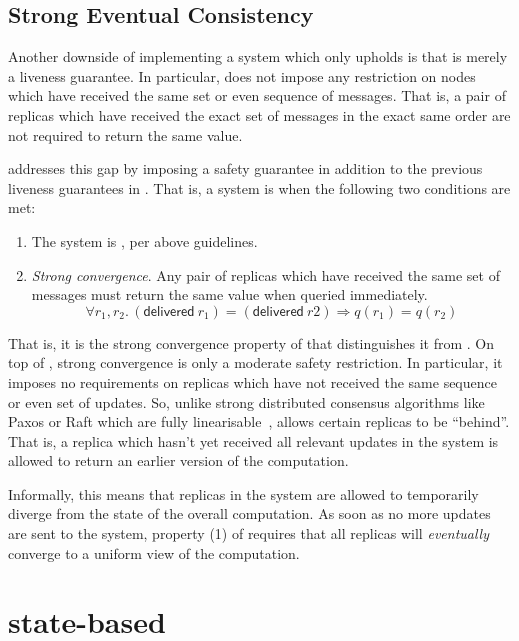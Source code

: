 \subsection{Strong Eventual Consistency}
Another downside of implementing a system which only upholds \EC is that \EC is
merely a liveness guarantee. In particular, \EC does not impose any restriction
on nodes which have received the same set or even sequence of messages. That is,
a pair of replicas which have received the exact set of messages in the exact
same order are not required to return the same value.

\SEC addresses this gap by imposing a safety guarantee in addition to the
previous liveness guarantees in \EC. That is, a system is \SEC when the
following two conditions are met:
\begin{enumerate}
  \item The system is \EC, per above guidelines.
  \item \emph{Strong convergence}. Any pair of replicas which have received the
    same set of messages must return the same value when queried immediately.
    \[
      \forall r_1, r_2.\, (\textsf{delivered}~r_1) = (\textsf{delivered}~r2)
        \Rightarrow q(r_1) = q(r_2)
    \]
\end{enumerate}

That is, it is the strong convergence property of \SEC that distinguishes it
from \EC. On top of \EC, strong convergence is only a moderate safety
restriction. In particular, it imposes no requirements on replicas which have
not received the same sequence or even set of updates. So, unlike strong
distributed consensus algorithms like Paxos or Raft which are fully
linearisable~\citep{lamport98,ongaro14}, \SEC allows certain replicas to be
``behind''. That is, a replica which hasn't yet received all relevant updates in
the system is allowed to return an earlier version of the computation.

Informally, this means that replicas in the system are allowed to temporarily
diverge from the state of the overall computation. As soon as no more updates
are sent to the system, property (1) of \EC requires that all replicas will
\emph{eventually} converge to a uniform view of the computation.

\section{state-based \CRDTs}
\label{sec:state-based-crdts}

